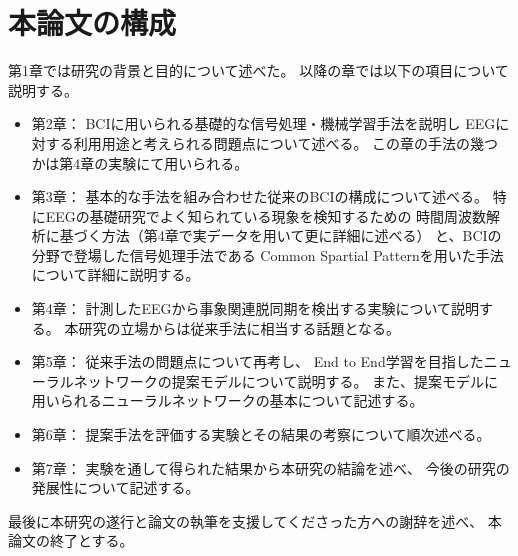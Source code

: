 \section{本論文の構成}
第1章では研究の背景と目的について述べた。
以降の章では以下の項目について説明する。
\begin{itemize}
    \item 第2章：
    BCIに用いられる基礎的な信号処理・機械学習手法を説明し
    EEGに対する利用用途と考えられる問題点について述べる。
    この章の手法の幾つかは第4章の実験にて用いられる。
    \item 第3章：
    基本的な手法を組み合わせた従来のBCIの構成について述べる。
    特にEEGの基礎研究でよく知られている現象を検知するための
    時間周波数解析に基づく方法（第4章で実データを用いて更に詳細に述べる）
    と、BCIの分野で登場した信号処理手法である
    Common Spartial Patternを用いた手法について詳細に説明する。
    \item 第4章：
    計測したEEGから事象関連脱同期を検出する実験について説明する。
    本研究の立場からは従来手法に相当する話題となる。
    \item 第5章：
    従来手法の問題点について再考し、
    End to End学習を目指したニューラルネットワークの提案モデルについて説明する。
    また、提案モデルに用いられるニューラルネットワークの基本について記述する。
    \item 第6章：
    提案手法を評価する実験とその結果の考察について順次述べる。
    \item 第7章：
    実験を通して得られた結果から本研究の結論を述べ、
    今後の研究の発展性について記述する。
\end{itemize}
最後に本研究の遂行と論文の執筆を支援してくださった方への謝辞を述べ、
本論文の終了とする。